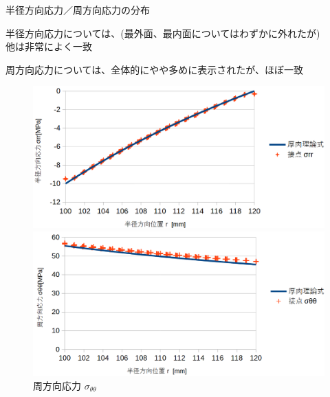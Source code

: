 \begin{frame}{半径方向応力／周方向応力の分布}
 
  半径方向応力については、(最外面、最内面についてはわずかに外れたが) \\
  他は非常によく一致

  周方向応力については、全体的にやや多めに表示されたが、ほぼ一致　
\begin{figure}[htbp]
\centering
  \begin{minipage}{0.49\columnwidth}
     \centering
     \includegraphics[width=\columnwidth]{images/results01.png}
     \caption{半径方向応力
       \begin{math}
         σ_{rr}
       \end{math}
     }
     \label{fig:hidari}
  \end{minipage}
%
  \begin{minipage}{0.49\columnwidth}
     \centering
     \includegraphics[width=\columnwidth]{images/results02.png}
     \caption{周方向応力
       \begin{math}
         σ_{\theta\theta}
       \end{math}
     }
     \label{fig:migi}
  \end{minipage}
\end{figure}

\end{frame}
